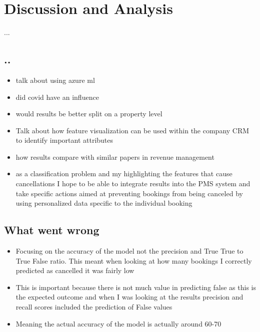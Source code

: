 \chapter{Discussion and Analysis}
...

\section{..}
\begin{itemize}
\item talk about using azure ml 
\item did covid have an influence
\item would results be better split on a property level
\item Talk about how feature visualization can be used within the company CRM to identify important attributes 
\item how results compare with similar papers in revenue management 
\item as a classification problem and my highlighting the features that cause cancellations I hope to be able to integrate results into the PMS system and take specific actions aimed at preventing bookings from being canceled by using personalized data specific to the individual booking
\end{itemize}



\section{What went wrong}
\begin{itemize}
\item Focusing on the accuracy of the model not the precision and True True to True False ratio. This meant when looking at how many bookings I correctly predicted as cancelled it was fairly low
\item This is important because there is not much value in predicting false as this is the expected outcome and when I was looking at the results precision and recall scores included the prediction of False values
\item Meaning the actual accuracy of the model is actually around 60-70 
\end{itemize}



